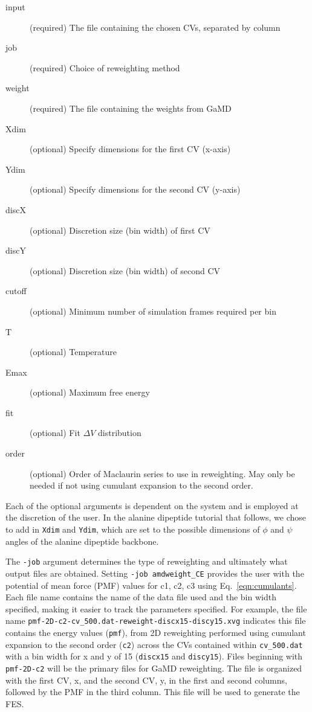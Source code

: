 \documentclass[9pt,tutorial,pubversion]{livecoms}
\begin{document}
\begin{description}
    \item[input] (required) The file containing the chosen CVs, separated by column
    \item[job] (required) Choice of reweighting method
    \item[weight] (required) The file containing the weights from GaMD
    \item[Xdim] (optional) Specify dimensions for the first CV (x-axis)
    \item[Ydim] (optional) Specify dimensions for the second CV (y-axis)
    \item[discX] (optional) Discretion size (bin width) of first CV
    \item[discY] (optional) Discretion size (bin width) of second CV
    \item[cutoff] (optional) Minimum number of simulation frames required per bin
    \item[T] (optional) Temperature
    \item[Emax] (optional) Maximum free energy
    \item[fit] (optional) Fit $\Delta{V}$ distribution
    \item[order] (optional) Order of Maclaurin series to use in reweighting. May only be needed if not using cumulant expansion to the second order.
\end{description}

Each of the optional arguments is dependent on the system and is employed at the discretion of the user. In the alanine dipeptide tutorial that follows, we chose to add in \texttt{Xdim} and \texttt{Ydim}, which are set to the possible dimensions of $\phi$ and $\psi$ angles of the alanine dipeptide backbone.

The \texttt{-job} argument determines the type of reweighting and ultimately what output files are obtained. Setting \texttt{-job amdweight\_CE} provides the user with the potential of mean force (PMF) values for c1, c2, c3 using Eq.~\ref{eqn:cumulants}. Each file name contains the name of the data file used and the bin width specified, making it easier to track the parameters specified. For example, the file name \texttt{pmf-2D-c2-cv\_500.dat-reweight-discx15-discy15.xvg} indicates this file contains the energy values (\texttt{pmf}), from 2D reweighting performed using cumulant expansion to the second order (\texttt{c2}) across the CVs contained within \texttt{cv\_500.dat} with a bin width for x and y of 15 (\texttt{discx15} and \texttt{discy15}). Files beginning with \texttt{pmf-2D-c2} will be the primary files for GaMD reweighting. The file is organized with the first CV, x, and the second CV, y, in the first and second columns, followed by the PMF in the third column. This file will be used to generate the FES.
\end{document}
